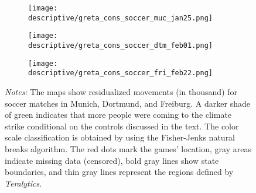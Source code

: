 \begin{figure}[H]\centering
	\caption{Validation: Participation soccer games}
	\label{fig_greta_cons:participation_soccer_games}
	\begin{subfigure}[h]{0.45\linewidth}\centering
		\texttt{[image: descriptive/greta\_cons\_soccer\_muc\_jan25.png]}
	\end{subfigure}
	\begin{subfigure}[h]{0.45\linewidth}\centering
		\texttt{[image: descriptive/greta\_cons\_soccer\_dtm\_feb01.png]}
	\end{subfigure}
	\begin{subfigure}[h]{0.45\linewidth}\centering
		\texttt{[image: descriptive/greta\_cons\_soccer\_fri\_feb22.png]}
	\end{subfigure}
	
	\begin{minipage}{0.9\linewidth}
		\scriptsize{\emph{Notes:} The maps show residualized movements (in thousand) for soccer matches in Munich, Dortmund, and Freiburg. A darker shade of green indicates that more people were coming to the climate strike conditional on the controls discussed in the text. The color scale classification is obtained by using the Fisher-Jenks natural breaks algorithm. The red dots mark the games' location, gray areas indicate missing data (censored), bold gray lines show state boundaries, and thin gray lines represent the regions defined by \textit{Teralytics}.}
	\end{minipage}
\end{figure}


